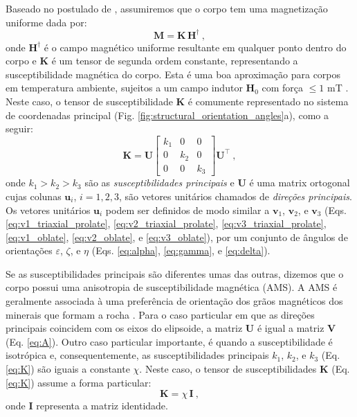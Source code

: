 Baseado no postulado de \citeauthor{maxwell1873}, assumiremos que o corpo tem uma magnetização uniforme dada por:
\begin{equation}
\mathbf{M} = \mathbf{K} \, \mathbf{H}^{\dagger} \: ,
\label{eq:M-KH}
\end{equation}
onde $\mathbf{H}^{\dagger}$ é o campo magnético uniforme resultante em qualquer ponto dentro do corpo e $\mathbf{K}$ é um tensor de segunda ordem constante, representando a susceptibilidade magnética do corpo. Esta é uma boa aproximação para corpos em temperatura ambiente, sujeitos a um campo indutor  $\mathbf{H}_{0}$ com força $\leq 1$ \unit{mT} \citep{rochette1992}. Neste caso, o tensor de susceptibilidade $\mathbf{K}$ é comumente representado no sistema de coordenadas principal (Fig. \ref{fig:structural_orientation_angles}a), como a seguir:
\begin{equation}
\mathbf{K} = \mathbf{U}
\left[ \begin{array}{ccc}
k_{1} & 0 & 0 \\
0 & k_{2} & 0 \\
0 & 0 & k_{3} 
\end{array} \right] \mathbf{U}^{\top} \: ,
\label{eq:K}
\end{equation}
onde $k_{1} > k_{2} > k_{3}$ são as 
\textit{susceptibilidades principais} e $\mathbf{U}$ é
uma matrix ortogonal cujas colunas $\mathbf{u}_{i}$,
$i = 1, 2, 3$, são vetores unitários chamados de 
\textit{direções principais}.
Os vetores unitários $\mathbf{u}_{i}$ podem ser definidos de modo similar a
$\mathbf{v}_{1}$, $\mathbf{v}_{2}$,
e $\mathbf{v}_{3}$ (Eqs. \ref{eq:v1_triaxial_prolate},
\ref{eq:v2_triaxial_prolate}, \ref{eq:v3_triaxial_prolate},
\ref{eq:v1_oblate}, \ref{eq:v2_oblate}, e \ref{eq:v3_oblate}),
por um conjunto de ângulos de orientações $\varepsilon$, $\zeta$,
e $\eta$ (Eqs. \ref{eq:alpha}, \ref{eq:gamma}, e
\ref{eq:delta}).

Se as susceptibilidades principais são diferentes umas das outras, dizemos que o corpo possui uma anisotropia de susceptibilidade magnética (AMS). A AMS é geralmente associada à uma preferência de orientação dos grãos magnéticos dos minerais que formam a rocha \citep{fuller1963, uyeda1963, janak1972, hrouda1982, thompson1986, macdonald1987, rochette1992, dunlop1997, tauxe2003rudiments}. Para o caso particular em que as direções principais coincidem com os eixos do elipsoide, a matriz $\mathbf{U}$ é igual a matriz $\mathbf{V}$ (Eq. \ref{eq:A}). Outro caso particular importante, é quando a susceptibilidade é isotrópica e, consequentemente, as susceptibilidades principais $k_{1}$, $k_{2}$, e $k_{3}$ (Eq. \ref{eq:K}) são iguais a constante $\chi$. Neste caso, o tensor de susceptibilidades $\mathbf{K}$ (Eq. \ref{eq:K}) assume a forma particular:
\begin{equation}
\mathbf{K} = \chi \, \mathbf{I} \: ,
\label{eq:K-isotropic}
\end{equation}
onde $\mathbf{I}$ representa a matriz identidade.


